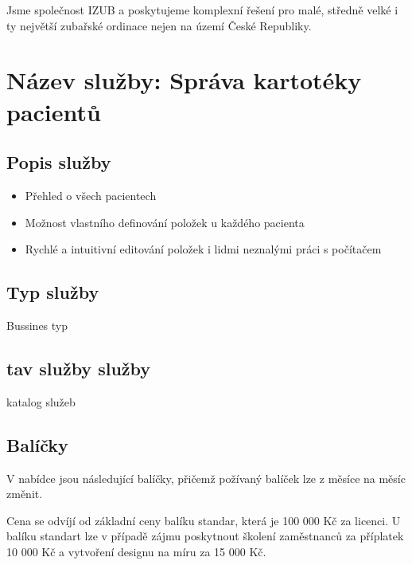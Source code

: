 \documentclass[12pt, a4paper, titlepage]{article}
\begin{document}
	\vspace{1em}

	\noindent Jsme společnost IZUB a poskytujeme komplexní řešení pro malé, středně velké i ty největší zubařské ordinace nejen na území České Republiky.
	\vspace{1em}

	\noindent\makebox[\linewidth]{\rule{16cm}{0.4pt}}

	\vspace{2em}

	\section*{Název služby: Správa kartotéky pacientů}
	\vspace{1em}

	\subsection*{Popis služby}
	\begin{itemize}
		\item Přehled o všech pacientech
		\item Možnost vlastního definování položek u každého pacienta
		\item Rychlé a intuitivní editování položek i lidmi neznalými práci s počítačem
	\end{itemize}

	\subsection*{Typ služby}

	Bussines typ

	\subsection*{tav služby služby}

	katalog služeb

	\subsection*{Balíčky}
	V nabídce jsou následující balíčky, přičemž požívaný balíček lze z měsíce na měsíc změnit.

	Cena se odvíjí od základní ceny balíku standar, která je 100 000 Kč za licenci. U balíku standart lze v případě zájmu poskytnout školení zaměstnanců za příplatek 10 000 Kč a vytvoření designu na míru za 15 000 Kč.
\end{document}
